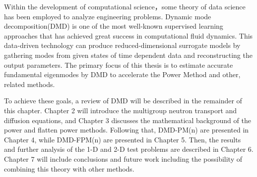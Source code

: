 Within the development of computational science，some theory of data science has been employed to analyze engineering problems.
Dynamic mode decomposition(DMD) is one of the most well-known supervised learning approaches that has achieved great success in computational fluid dynamics.
This data-driven technology can produce reduced-dimensional surrogate models by gathering modes from given states of time dependent data and reconstructing the output parameters.
The primary focus of this thesis is to estimate accurate fundamental eigenmodes by DMD to accelerate the Power Method and other, related methods.

To achieve these goals, a review of DMD will be described in the remainder of this chapter.
Chapter 2 will introduce the multigroup neutron transport and diffusion equations, and Chapter 3 discusses the mathematical background of the power and flatten power methods.
Following that, DMD-PM(n) are presented in Chapter 4, while DMD-FPM(n) are presented in Chapter 5.
Then, the results and further analysis of the 1-D and 2-D test problems are described in Chapter 6.
Chapter 7 will include conclusions and future work including the possibility of combining this theory with other methods. 


